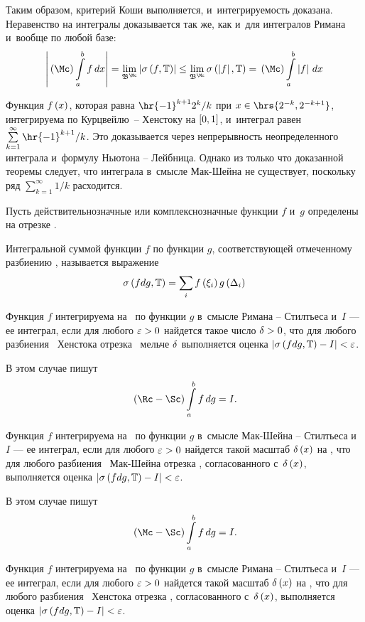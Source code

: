 \documentclass[draft]{article}
\begin{document}
Таким образом, критерий Коши выполняется, и~интегрируемость
доказана. Неравенство на интегралы доказывается так же, как и~для
интегралов Римана и~вообще по любой базе:
$$\abs{\macsh\intabfdx}=\lim\limits_{\basemacsh}\abs\isfT\le
\lim\limits_{\basemacsh}\isum(\abs f,\T)=\macsh\intab\abs{f},x$$

\prtm

\bigskip

\ex Функция $f\atx$, которая равна $\hr{-1}^{k+1}2^k/k$ при
$x\in\hrs{2^{-k},2^{-k+1}}$, интегрируема по Курцвейлю~-- Хенстоку
на $\seg[0,1]$, и~интеграл равен
$\sum\limits_{k=1}^{\infty}\hr{-1}^{k+1} /k$. Это доказывается
через непрерывность неопределенного интеграла и~формулу Ньютона --
Лейбница. Однако из только что доказанной теоремы следует, что
интеграла в~смысле Мак-Шейна не существует, поскольку ряд
$\sum\limits_{k=1}^{\infty}1/k$ расходится.

\eject



Пусть действительнозначные или комплекснозначные функции $f$ и~$g$
определены на отрезке \ab.

\bigskip

\df Интегральной суммой функции $f$ по функции $g$, соответствующей
отмеченному разбиению \Tdixif, называется выражение
$$\isfdgT=\sumi\fxigdi$$

\bigskip

\df Функция $f$ интегрируема на \ab\ по функции $g$ в~смысле Римана
-- Стилтьеса и~$I$ --- ее интеграл, если для любого $\varepsilon > 0$ найдется
такое число $\delta > 0$, что для любого разбиения \Tdixif\ Хенстока
отрезка \ab\ мельче $\delta$ выполняется оценка $\abs{\isfdgT-I}<\ep$.

В этом случае пишут $$\rimanst\intabfdg=I.$$

\bigskip

\df Функция $f$ интегрируема на \ab\ по функции $g$ в~смысле
Мак-Шейна -- Стилтьеса и~$I$ --- ее интеграл, если для любого
$\varepsilon > 0$ найдется такой масштаб $\dex$ на \ab, что для любого
разбиения \Tdixif\ Мак-Шейна отрезка \ab, согласованного с~$\dex$,
выполняется оценка $\abs{\isfdgT-I}<\ep$.

В этом случае пишут $$\macshst\intabfdg=I.$$

\bigskip

\df Функция $f$ интегрируема на \ab\ по функции $g$ в~смысле Римана
-- Стилтьеса и~$I$ --- ее интеграл, если для любого $\varepsilon > 0$ найдется
такой масштаб $\dex$ на \ab, что для любого разбиения \Tdixif\
Хенстока отрезка \ab, согласованного с~$\dex$, выполняется оценка
$\abs{\isfdgT-I}<\ep$.
\end{document}
